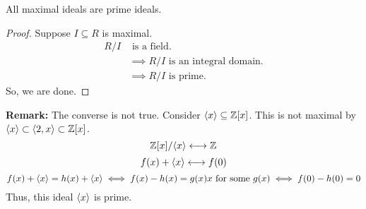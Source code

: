 \documentclass[letterpaper]{article}
\begin{document}
\begin{corollary}{}{}
    All maximal ideals are prime ideals.
\end{corollary}

\begin{mdframed}[]
    \begin{proof}
        Suppose $I \subseteq R$ is maximal.
        \begin{equation*}
            \begin{aligned}
                R / I& \text{ is a field.} \\ 
                    &\implies R / I \text{ is an integral domain.} \\ 
                    &\implies R / I \text{ is prime.}
            \end{aligned}
        \end{equation*}
        So, we are done.
    \end{proof}
\end{mdframed}

\textbf{Remark:} The converse is not true. Consider $\langle x \rangle \subseteq \mathbb{Z}[x]$. This is not maximal by $\langle x \rangle \subset \langle 2, x \rangle \subset \mathbb{Z}[x]$. 
\[\mathbb{Z}[x] / \langle x \rangle \longleftrightarrow \mathbb{Z}\]
\[f(x) + \langle x \rangle \longleftrightarrow f(0)\]
\[f(x) + \langle x \rangle = h(x) + \langle x \rangle \iff f(x) - h(x) = g(x)x \text{ for some } g(x) \iff f(0) - h(0) = 0\]
Thus, this ideal $\langle x \rangle$ is prime.
\end{document}
